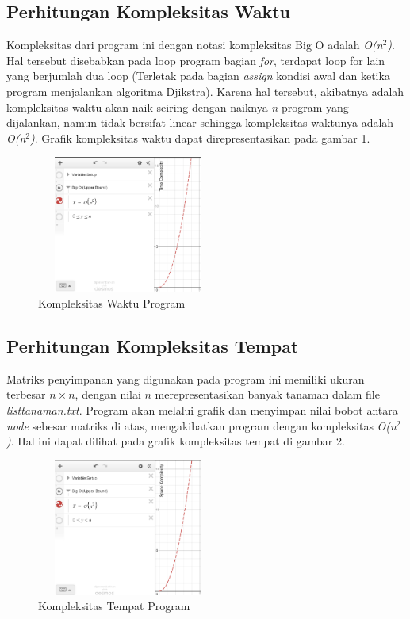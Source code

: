 \documentclass[conference]{IEEEtran}
\begin{document}
\subsection{Perhitungan Kompleksitas Waktu}
Kompleksitas dari program ini dengan notasi kompleksitas Big O adalah \textit{O(n$^{2}$)}.
Hal tersebut disebabkan pada loop program bagian \textit{for}, terdapat loop for lain yang berjumlah dua loop (Terletak pada bagian \textit{assign} kondisi awal dan ketika program menjalankan algoritma Djikstra).
Karena hal tersebut, akibatnya adalah kompleksitas waktu akan naik seiring dengan naiknya \textit{n} program yang dijalankan, namun tidak bersifat linear sehingga kompleksitas waktunya adalah \textit{O(n$^{2}$)}.
Grafik kompleksitas waktu dapat direpresentasikan pada gambar 1.
\begin{figure}[h]
    \includegraphics[width =6cm, height = 4.5cm]{Time_complexity.png}
    \centering
    \caption{Kompleksitas Waktu Program}
\end{figure}

\subsection{Perhitungan Kompleksitas Tempat}
Matriks penyimpanan yang digunakan pada program ini memiliki ukuran terbesar $n \times n$, dengan nilai $n$ merepresentasikan banyak tanaman dalam file \textit{listtanaman.txt}.
Program akan melalui grafik dan menyimpan nilai bobot antara \textit{node} sebesar matriks di atas, mengakibatkan program dengan kompleksitas \textit{O(n$^{2}$)}.
Hal ini dapat dilihat pada grafik kompleksitas tempat di gambar 2.
\begin{figure}[h]
    \includegraphics[width = 6cm, height = 4.5cm]{Space_complexity.png}
    \centering
    \caption{Kompleksitas Tempat Program}
\end{figure}
\end{document}
